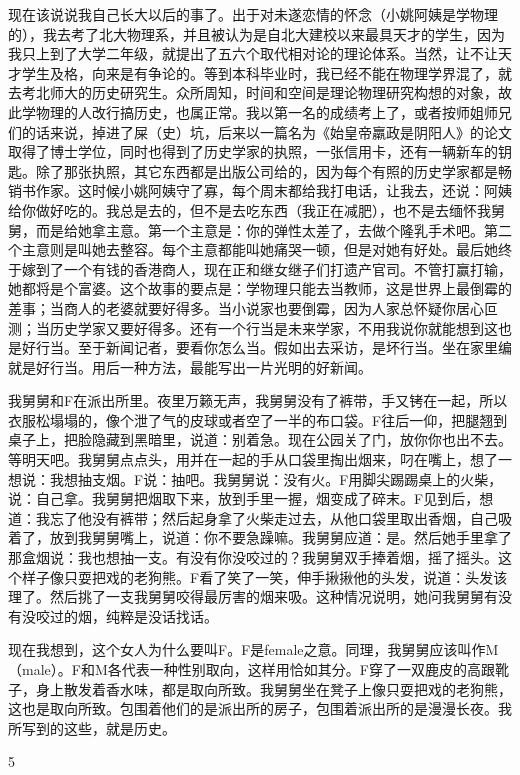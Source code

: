 现在该说说我自己长大以后的事了。出于对未遂恋情的怀念（小姚阿姨是学物理的），我去考了北大物理系，并且被认为是自北大建校以来最具天才的学生，因为我只上到了大学二年级，就提出了五六个取代相对论的理论体系。当然，让不让天才学生及格，向来是有争论的。等到本科毕业时，我已经不能在物理学界混了，就去考北师大的历史研究生。众所周知，时间和空间是理论物理研究构想的对象，故此学物理的人改行搞历史，也属正常。我以第一名的成绩考上了，或者按师姐师兄们的话来说，掉进了屎（史）坑，后来以一篇名为《始皇帝羸政是阴阳人》的论文取得了博士学位，同时也得到了历史学家的执照，一张信用卡，还有一辆新车的钥匙。除了那张执照，其它东西都是出版公司给的，因为每个有照的历史学家都是畅销书作家。这时候小姚阿姨守了寡，每个周末都给我打电话，让我去，还说：阿姨给你做好吃的。我总是去的，但不是去吃东西（我正在减肥），也不是去缅怀我舅舅，而是给她拿主意。第一个主意是：你的弹性太差了，去做个隆乳手术吧。第二个主意则是叫她去整容。每个主意都能叫她痛哭一顿，但是对她有好处。最后她终于嫁到了一个有钱的香港商人，现在正和继女继子们打遗产官司。不管打赢打输，她都将是个富婆。这个故事的要点是：学物理只能去当教师，这是世界上最倒霉的差事；当商人的老婆就要好得多。当小说家也要倒霉，因为人家总怀疑你居心叵测；当历史学家又要好得多。还有一个行当是未来学家，不用我说你就能想到这也是好行当。至于新闻记者，要看你怎么当。假如出去采访，是坏行当。坐在家里编就是好行当。用后一种方法，最能写出一片光明的好新闻。 

我舅舅和F在派出所里。夜里万籁无声，我舅舅没有了裤带，手又铐在一起，所以衣服松塌塌的，像个泄了气的皮球或者空了一半的布口袋。F往后一仰，把腿翘到桌子上，把脸隐藏到黑暗里，说道：别着急。现在公园关了门，放你你也出不去。等明天吧。我舅舅点点头，用并在一起的手从口袋里掏出烟来，叼在嘴上，想了一想说：我想抽支烟。F说：抽吧。我舅舅说：没有火。F用脚尖踢踢桌上的火柴，说：自己拿。我舅舅把烟取下来，放到手里一握，烟变成了碎末。F见到后，想道：我忘了他没有裤带；然后起身拿了火柴走过去，从他口袋里取出香烟，自己吸着了，放到我舅舅嘴上，说道：你不要急躁嘛。我舅舅应道：是。然后她手里拿了那盒烟说：我也想抽一支。有没有你没咬过的？我舅舅双手捧着烟，摇了摇头。这个样子像只耍把戏的老狗熊。F看了笑了一笑，伸手揪揪他的头发，说道：头发该理了。然后挑了一支我舅舅咬得最厉害的烟来吸。这种情况说明，她问我舅舅有没有没咬过的烟，纯粹是没话找话。 

现在我想到，这个女人为什么要叫F。F是female之意。同理，我舅舅应该叫作M（male）。F和M各代表一种性别取向，这样用恰如其分。F穿了一双鹿皮的高跟靴子，身上散发着香水味，都是取向所致。我舅舅坐在凳子上像只耍把戏的老狗熊，这也是取向所致。包围着他们的是派出所的房子，包围着派出所的是漫漫长夜。我所写到的这些，就是历史。 

5 

